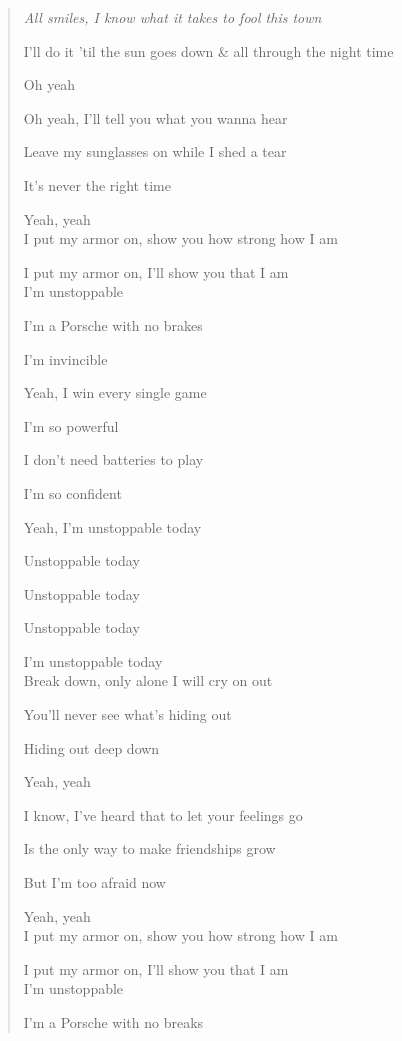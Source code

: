 \documentclass{article}
\begin{document}
\begin{enumerate}
	\begin{quotation}\it
		All smiles, I know what it takes to fool this town

		I'll do it 'til the sun goes down \& all through the night time

		Oh yeah

		Oh yeah, I'll tell you what you wanna hear

		Leave my sunglasses on while I shed a tear

		It's never the right time

		Yeah, yeah
		\\

		I put my armor on, show you how strong how I am

		I put my armor on, I'll show you that I am
		\\

		I'm unstoppable

		I'm a Porsche with no brakes

		I'm invincible

		Yeah, I win every single game

		I'm so powerful

		I don't need batteries to play

		I'm so confident

		Yeah, I'm unstoppable today

		Unstoppable today

		Unstoppable today

		Unstoppable today

		I'm unstoppable today
		\\

		Break down, only alone I will cry on out

		You'll never see what's hiding out

		Hiding out deep down

		Yeah, yeah

		I know, I've heard that to let your feelings go

		Is the only way to make friendships grow

		But I'm too afraid now

		Yeah, yeah
		\\

		I put my armor on, show you how strong how I am

		I put my armor on, I'll show you that I am
		\\

		I'm unstoppable

		I'm a Porsche with no breaks


\end{quotation}
\end{enumerate}
\end{document}
